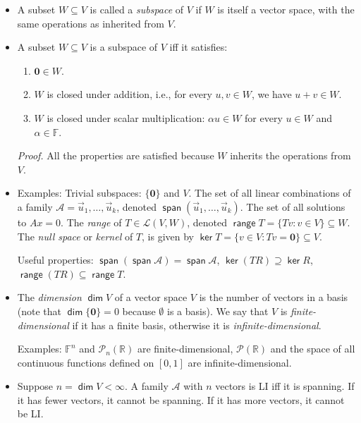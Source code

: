 \documentclass[11pt]{article}
\newcommand{\1}{\mathbf{1}}
\newcommand{\0}{\mathbf{0}}
\newcommand{\A}{\mathcal{A}}
\newcommand{\F}{\mathbb{F}}
\newcommand{\cL}{\mathcal{L}}
\newcommand{\R}{\mathbb{R}}
\newcommand{\cP}{\mathcal{P}}
\DeclareMathOperator{\myspan}{\mathsf{span}}
\DeclareMathOperator{\myrange}{\mathsf{range}}
\DeclareMathOperator{\myker}{\mathsf{ker}}
\DeclareMathOperator{\mydim}{\mathsf{dim}}
\newcommand{\vu}{\vec{u}}
\newcommand{\spitem}{\item[$\circ$]}
\begin{document}
\begin{itemize}

\item

A subset $W \subseteq V$ is called a \emph{subspace} of $V$ if $W$ is itself a vector space, with the same operations as inherited from $V$.

\item

A subset $W \subseteq V$ is a subspace of $V$ iff it satisfies:
\begin{enumerate}
\item
$\0 \in W$.
\item
$W$ is closed under addition, i.e., for every $u,v \in W$, we have $u+v \in W$.
\item
$W$ is closed under scalar multiplication: $\alpha u \in W$ for every $u \in W$ and $\alpha \in \F$.
\end{enumerate}

\emph{Proof.}
All the properties are satisfied because $W$ inherits the operations from $V$.



\spitem

Examples:
Trivial subspaces: $\{\0\}$ and $V$.
The set of all linear combinations of a family $\A=\vu_1,\dots,\vu_k$, denoted $\myspan(\vu_1,\dots,\vu_k)$.
The set of all solutions to $Ax=0$.
The \emph{range} of $T\in\cL(V,W)$, denoted $\myrange T = \{Tv:v\in V\} \subseteq W$.
The \emph{null space} or \emph{kernel} of $T$, is given by $\myker T = \{v\in V:Tv=\0\}\subseteq V$.

Useful properties:
$\myspan (\myspan \A) = \myspan \A$,
$\myker (TR) \supseteq \myker R$,
$\myrange (TR) \subseteq \myrange T$.
\\

\item
The \emph{dimension} $\mydim V$ of a vector space $V$ is the number of vectors in a basis (note that $\mydim\{\0\}=0$ because $\emptyset$ is a basis).
We say that $V$ is \emph{finite-dimensional} if it has a finite basis, otherwise it is \emph{infinite-dimensional}.

Examples: $\F^n$ and $\cP_n(\R)$ are finite-dimensional, $\cP(\R)$ and the space of all continuous functions defined on $[0,1]$ are infinite-dimensional.

\spitem

Suppose $n = \mydim V < \infty$.
A family $\A$ with $n$ vectors is LI iff it is spanning.
If it has fewer vectors, it cannot be spanning.
If it has more vectors, it cannot be LI.


\end{itemize}
\end{document}
